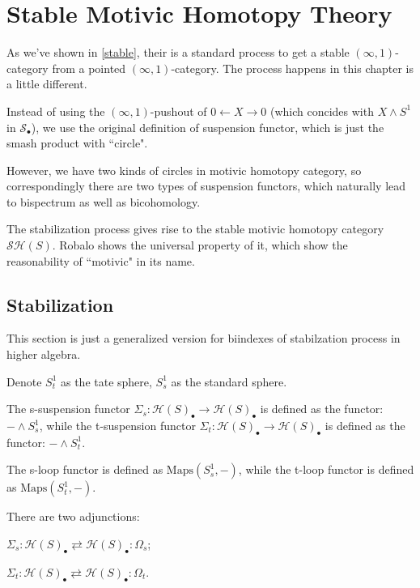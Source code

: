\chapter{Stable Motivic Homotopy Theory}

As we've shown in \ref{stable}, their is a standard process to get a stable $(\infty,1)$-category from a pointed $(\infty,1)$-category. The process happens in this chapter is a little different.

Instead of using the $(\infty,1)$-pushout of $0\gets X\to0$ (which concides with $X\wedge S^1$ in $\mathscr{S}_\bullet$), we use the original definition of suspension functor, which is just the smash product with ``circle".

However, we have two kinds of circles in motivic homotopy category, so correspondingly there are two types of suspension functors, which naturally lead to bispectrum as well as bicohomology.

The stabilization process gives rise to the stable motivic homotopy category $\mathcal{SH}(S)$. Robalo shows\cite{Robalo2015} the universal property of it, which show the reasonability of ``motivic" in its name.

\section{Stabilization}

This section is just a generalized version for biindexes of stabilzation process in higher algebra.

\begin{remark}
    Denote $S_t^1$ as the tate sphere, $S_s^1$ as the standard sphere.
\end{remark}

\begin{definition}
    The s-suspension functor $\Sigma_s:\mathcal{H}(S)_\bullet \to \mathcal{H}(S)_\bullet$ is defined as the functor: $-\wedge S_s^1$, while the t-suspension functor $\Sigma_t:\mathcal{H}(S)_\bullet \to \mathcal{H}(S)_\bullet$ is defined as the functor: $-\wedge S_t^1$.
\end{definition}

\begin{definition}
    The s-loop functor is defined as $\text{Maps}(S_s^1,-)$, while the t-loop functor is defined as $\text{Maps}(S_t^1,-)$.
\end{definition}

\begin{proposition}
    There are two adjunctions:

    $\Sigma_s: \mathcal{H}(S)_\bullet \rightleftarrows \mathcal{H}(S)_\bullet: \Omega_s$;

    $\Sigma_t: \mathcal{H}(S)_\bullet \rightleftarrows \mathcal{H}(S)_\bullet: \Omega_t$.
\end{proposition}



